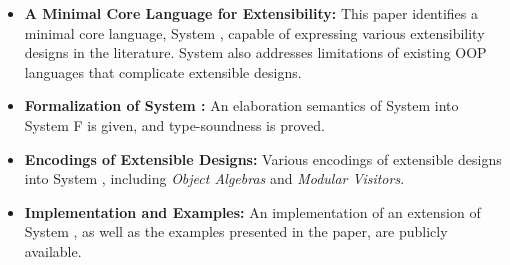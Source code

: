 \begin{itemize}

\item {\bf A Minimal Core Language for Extensibility:} This paper
  identifies a minimal core language, System \name, capable of
  expressing various extensibility designs in the literature.
  System \name also addresses limitations of existing OOP
  languages that complicate extensible designs. 
  
\item {\bf Formalization of System \name:} An elaboration semantics of
  System \name into System F is given, and type-soundness is proved.

\item {\bf Encodings of Extensible Designs:} Various encodings of
  extensible designs into System \name, including \emph{Object
    Algebras} and \emph{Modular Visitors}. 

\item {\bf Implementation and Examples:} An implementation of an
  extension of System \name, as well as the examples presented in the
  paper, are publicly available. 

\begin{comment}

\item{elaboration typing rules which given a source expression with intersection
    types, typecheck and translate it into an ordinary F term. Prove a type
    preservation result: if a term $ e $ has type $ \ty $ in the source language,
    then the translated term $ \image e $ is well-typed and has type $ \image \ty $ in the
    target language.}

\item{present an algorithm for detecting incoherence which can be very important
    in practice.}

\item{explores the connection between intersection types and object algebra by
    showing various examples of encoding object algebra with intersection
    types.}

\end{comment}

\end{itemize}

\begin{comment}
\subsection{Other Notes}

finitary overloading: yes
but have other merits of intersection been explored?

-- Compare Scala:
-- merge[A,B] = new A with B

-- type IEval  = { eval :  Int }
-- type IPrint = { print : String }

-- F[\_]
\end{comment}